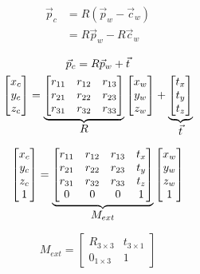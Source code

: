 \noindent 

\begin{subequations}
    \begin{align}
        \vec{p}_c & = R(\vec{p}_w-\vec{c}_w) \\
                  & = R\vec{p}_w -R\vec{c}_w  
    \end{align}
\end{subequations}



\begin{gather}
    \vec{p}_c = R\vec{p}_w + \vec{t} \\
    \begin{bmatrix}
        x_c \\ y_c \\ z_c
    \end{bmatrix}
    =
    \underbrace{
        \begin{bmatrix}
            r_{11} & r_{12} & r_{13} \\
            r_{21} & r_{22} & r_{23} \\
            r_{31} & r_{32} & r_{33}
        \end{bmatrix}
    }_{\mathlarger{R}}
    \begin{bmatrix}
        x_w \\ y_w \\ z_w
    \end{bmatrix}
    +
    \underbrace{  
        \begin{bmatrix}
            t_x \\ t_y \\ t_z
        \end{bmatrix}
    }_{\mathlarger{\vec{t}}}
\end{gather}


\begin{equation}
    \begin{bmatrix}
        x_c \\ y_c \\ z_c \\ 1
    \end{bmatrix}
    =
    \underbrace{
        \begin{bmatrix}
            r_{11} & r_{12} & r_{13} & t_x \\
            r_{21} & r_{22} & r_{23} & t_y \\
            r_{31} & r_{32} & r_{33} & t_z \\
            0      & 0      & 0      & 1
        \end{bmatrix}
    }_{\mathlarger{M_{ext}}}
    \begin{bmatrix}
        x_w \\ y_w \\ z_w \\1
    \end{bmatrix}
\end{equation}

\begin{equation}
    M_{ext} = 
    \begin{bmatrix}
        R_{3 \times 3} & t_{3 \times 1} \\
        0_{1 \times 3} & 1
    \end{bmatrix} 
\end{equation}
